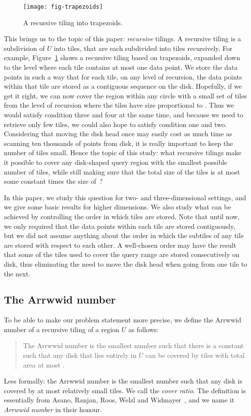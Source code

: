 \documentclass[11pt,a4paper]{article}
\newcommand{\unittile}{\ensuremath{U}\xspace}
\begin{document}
\begin{figure}
\centering
\texttt{[image: fig-trapezoids]}
\caption{A recursive tiling into trapezoids.}
\label{fig:trapezoids}
\end{figure}

This brings us to the topic of this paper: \emph{recursive} tilings. A recursive tiling is a subdivision of \unittile into tiles, that are each subdivided into tiles recursively. For example, Figure~\ref{fig:trapezoids} shows a recursive tiling based on trapezoids, expanded down to the level where each tile contains at most one data point. We store the data points in such a way that for each tile, on any level of recursion, the data points within that tile are stored as a contiguous sequence on the disk. Hopefully, if we get it right, we can now cover the region within any circle  with a small set of tiles from the level of recursion where the tiles have size proportional to . Thus we would satisfy condition three and four at the same time, and because we need to retrieve only few tiles, we could also hope to satisfy condition one and two. Considering that moving the disk head once may easily cost as much time as scanning ten thousands of points from disk, it is really important to keep the number of tiles small. Hence the topic of this study: what recursive tilings make it possible to cover any disk-shaped query region  with the smallest possible number of tiles, while still making sure that the total size of the tiles is at most some constant times the size of~?

In this paper, we study this question for two- and three-dimensional settings, and we give some basic results for higher dimensions. We also study what can be achieved by controlling the order in which tiles are stored. Note that until now, we only required that the data points within each tile are stored contiguously, but we did not assume anything about the order in which the subtiles of any tile are stored with respect to each other. A well-chosen order may have the result that some of the tiles used to cover the query range are stored consecutively on disk, thus eliminating the need to move the disk head when going from one tile to the next.

\subsection{The Arrwwid number}
To be able to make our problem statement more precise, we define the Arrwwid number of a recursive tiling of a region \unittile as follows:\begin{quote}
The Arrwwid number is the smallest number  such that there is a constant  such that any disk  that lies entirely in \unittile can be covered by  tiles with total area at most .
\end{quote}
Less formally: the Arrwwid number is the smallest number  such that any disk is covered by at most  relatively small tiles. We call  the \emph{cover ratio}. The definition is essentially from Asano, Ranjan, Roos, Welzl and Widmayer~\cite{Asano1997}, and we name it \emph{Arrwwid number} in their honour.
\end{document}
